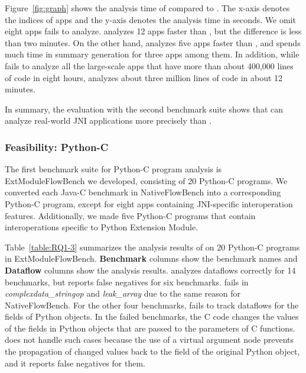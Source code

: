 Figure~\ref{fig:graph} shows the analysis time of \ours compared to \lees.
The x-axis denotes the indices of apps and the y-axis denotes the analysis time
in seconds. We omit eight apps \lees fails to analyze.
\lees analyzes 12 apps faster than \ours, but the difference is less than two minutes. 
On the other hand, \ours analyzes five apps faster than \lees, and \lees spends
much time in summary generation for three apps among them. 
In addition, while \lees fails to analyze all the large-scale apps that have
more than about 400,000 lines of code in eight hours, \ours analyzes about
three million lines of code in about 12 minutes.

In summary, the evaluation with the second benchmark suite shows that
\ours can analyze real-world JNI applications more precisely than \lees.

\subsubsection{Feasibility: Python-C}


The first benchmark suite for Python-C program analysis is ExtModuleFlowBench we developed,
consisting of 20 Python-C programs.
We converted each Java-C benchmark in NativeFlowBench into a
corresponding Python-C program, except for eight apps containing JNI-specific interoperation
features. Additionally, we made five Python-C programs that contain interoperations
specific to Python Extension Module.

Table~\ref{table:RQ1-3} summarizes the analysis results of \ours
on 20 Python-C programs in ExtModuleFlowBench.
{\bf Benchmark} columns show the benchmark names and {\bf Dataflow}
columns show the analysis results.
\ours analyzes dataflows correctly for 14 benchmarks, but reports false
negatives for six benchmarks.
\ours fails in {\it complexdata\_stringop} and {\it leak\_array} due to the
same reason for NativeFlowBench.
For the other four benchmarks, \ours fails to track dataflows for the fields of Python objects. 
In the failed benchmarks, the C code changes the values of the fields in Python objects that are passed
to the parameters of C functions.
\ours does not handle such cases because
the use of a virtual argument node prevents the propagation of changed values
back to the field of the original Python object, and it
reports false negatives for them.

